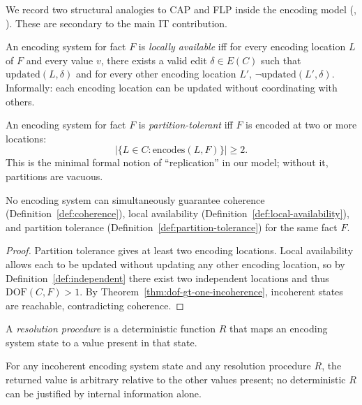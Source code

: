 We record two structural analogies to CAP and FLP inside the encoding model (, ). These are secondary to the main IT contribution.

\begin{definition}\label{def:local-availability}
An encoding system for fact $F$ is \emph{locally available} iff for every encoding location $L$ of $F$ and every value $v$, there exists a valid edit $\delta \in E(C)$ such that $\text{updated}(L, \delta)$ and for every other encoding location $L'$, $\neg \text{updated}(L', \delta)$. Informally: each encoding location can be updated without coordinating with others.
\end{definition}

\begin{definition}\label{def:partition-tolerance}
An encoding system for fact $F$ is \emph{partition-tolerant} iff $F$ is encoded at two or more locations:
\[
|\{L \in C : \text{encodes}(L, F)\}| \ge 2.
\]
This is the minimal formal notion of ``replication'' in our model; without it, partitions are vacuous.
\end{definition}

\begin{theorem}\label{thm:cap-encoding}
No encoding system can simultaneously guarantee coherence (Definition~\ref{def:coherence}), local availability (Definition~\ref{def:local-availability}), and partition tolerance (Definition~\ref{def:partition-tolerance}) for the same fact $F$.
\end{theorem}

\begin{proof}
Partition tolerance gives at least two encoding locations. Local availability allows each to be updated without updating any other encoding location, so by Definition~\ref{def:independent} there exist two independent locations and thus $\text{DOF}(C, F) > 1$. By Theorem~\ref{thm:dof-gt-one-incoherence}, incoherent states are reachable, contradicting coherence.
\end{proof}

\begin{definition}\label{def:resolution-procedure}
A \emph{resolution procedure} is a deterministic function $R$ that maps an encoding system state to a value present in that state.
\end{definition}

\begin{theorem}\label{thm:static-flp}
For any incoherent encoding system state and any resolution procedure $R$, the returned value is arbitrary relative to the other values present; no deterministic $R$ can be justified by internal information alone.
\end{theorem}


